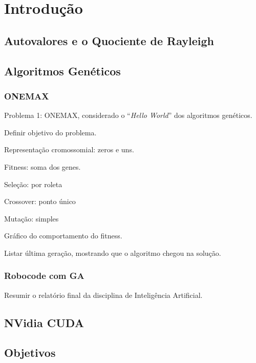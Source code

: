 \chapter{Introdução}
\label{cap:introducao}

\setcounter{page}{12}

\section{Autovalores e o Quociente de Rayleigh}

\section{Algoritmos Genéticos}

\subsection{ONEMAX}

	Problema 1: ONEMAX, considerado o ``\textit{Hello World}'' dos algoritmos genéticos.
	
	Definir objetivo do problema.
	
	Representação cromossomial: zeros e uns.
	
	Fitness: soma dos genes.
	
	Seleção: por roleta
	
	Crossover: ponto único
	
	Mutação: simples
	
	Gráfico do comportamento do fitness.
	
	Listar última geração, mostrando que o algoritmo chegou na solução.

\subsection{Robocode com GA}

	Resumir o relatório final da disciplina de Inteligência Artificial.
	
\section{NVidia CUDA}

\section{Objetivos}